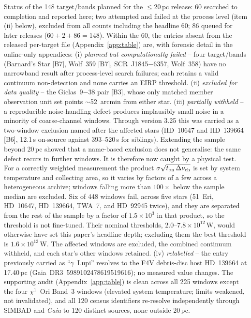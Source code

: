\documentclass{openjournal}
\begin{document}
Status of the 148 target/bands planned for the $\le$20\,pc release: 60
searched to completion and reported here; two attempted and failed at
the process level (item (ii) below), excluded from all counts
including the headline 60; 86 queued for later releases
($60+2+86=148$). Within the 60, the entries absent from
the released per-target file (Appendix~\ref{app:table}) are, with forensic detail in the online-only
appendices:
(i) \emph{planned but computationally failed} -- four target/bands
(Barnard's Star [B7], Wolf~359 [B7], SCR~J1845$-$6357, Wolf~358) have
no narrowband result after process-level search failures; each retains
a valid continuum non-detection and none carries an EIRP threshold.
(ii) \emph{excluded for data quality} -- the Giclas~9$-$38 pair [B3],
whose only matched member observation unit set points
$\sim$52~arcmin from either star.
(iii) \emph{partially withheld} -- a reproducible noise-handling defect
produces implausibly small noise in a minority of coarse-channel
windows. Through version 3.25 this was carried as a two-window
exclusion named after the affected stars (HD~10647 and HD~139664 [B6],
12.1\,s on-source against 393--520\,s for siblings). Extending the
sample beyond 20\,pc showed that a name-based exclusion does not
generalise: the same defect recurs in further windows. It is therefore
now caught by a physical test. For a correctly weighted measurement the
product $\sigma\sqrt{t_{\rm on}\,\Delta\nu_{\rm ch}}$ is set by system
temperature and collecting area, so it varies by factors of a few
across a heterogeneous archive; windows falling more than $100\times$
below the sample median are excluded. Six of 448 windows fail, across
five stars (51~Eri, HD~10647, HD~139664, TWA~7, and HD~92945 twice),
and they are separated from the rest of the sample by a factor of
$1.5\times10^{3}$ in that product, so the threshold is not fine-tuned.
Their nominal thresholds, $2.0$--$7.8\times10^{12}$\,W, would otherwise
have set this paper's headline depth; excluding them the best threshold
is $1.6\times10^{13}$\,W. The affected windows are excluded, the
combined continuum withheld, and each star's other windows retained.
(iv) \emph{relabelled} -- the entry previously carried as
``$\gamma$~Lupi'' resolves to the F4V debris-disc host HD~139664 at
17.40\,pc (Gaia~DR3~5989102478619519616); no measured value changes.
The supporting audit (Appendix~\ref{app:table}) is clean across all
225 windows except the four $\chi^{1}$~Ori Band~3 windows (elevated
system temperature; limits weakened, not invalidated), and all 120
census identifiers re-resolve independently through SIMBAD and
\emph{Gaia} to 120 distinct sources, none outside 20\,pc.
\end{document}
